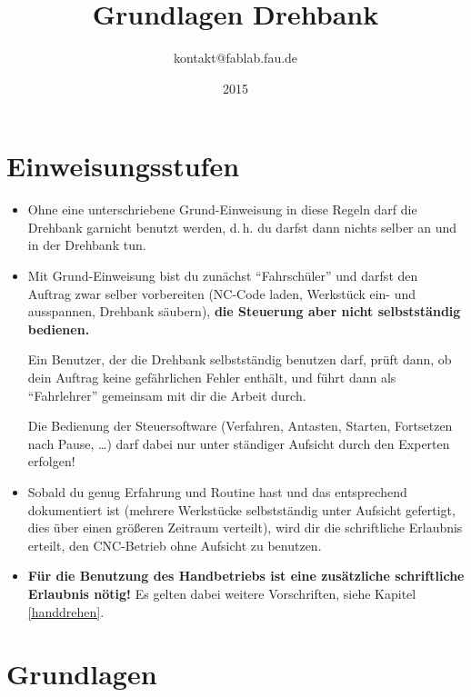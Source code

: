\documentclass{\basedir/fablab-document}
\date{2015}
\author{kontakt@fablab.fau.de}
\title{Grundlagen Drehbank}
\begin{document}
\listoftodos

\tableofcontents

\newpage

\section{Einweisungsstufen}

\begin{itemize}
 \item Ohne eine unterschriebene Grund-Einweisung in diese Regeln darf die Drehbank garnicht benutzt werden, d.\,h. du darfst dann nichts selber an und in der Drehbank tun.
 \item Mit Grund-Einweisung bist du zunächst \enquote{Fahrschüler} und darfst den Auftrag zwar selber vorbereiten (NC-Code laden, Werkstück ein- und ausspannen, Drehbank säubern), \textbf{die Steuerung aber nicht selbstständig bedienen.} 

       Ein Benutzer, der die Drehbank selbstständig benutzen darf, prüft dann, ob dein Auftrag keine gefährlichen Fehler enthält, und führt dann als \enquote{Fahrlehrer} gemeinsam mit dir die Arbeit durch.

 Die Bedienung der Steuersoftware (Verfahren, Antasten, Starten, Fortsetzen nach Pause, \dots) darf dabei nur unter ständiger Aufsicht durch den Experten erfolgen!
 \item Sobald du genug Erfahrung und Routine hast und das entsprechend dokumentiert ist (mehrere Werkstücke selbstständig unter Aufsicht gefertigt, dies über einen größeren Zeitraum verteilt), wird dir die schriftliche Erlaubnis erteilt, den CNC-Betrieb ohne Aufsicht zu benutzen.
 \item  \textbf{Für die Benutzung des Handbetriebs ist eine zusätzliche schriftliche Erlaubnis nötig!} Es gelten dabei weitere Vorschriften, siehe Kapitel \ref{handdrehen}.
\end{itemize}


\newpage
\section{Grundlagen}
\end{document}
